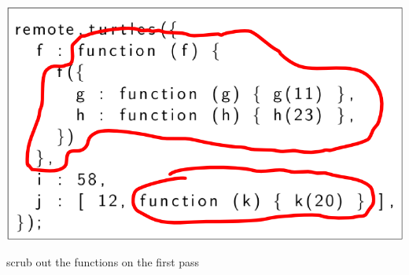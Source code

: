 \documentclass{beamer}
\begin{document}
\begin{frame}
\begin{columns}[c]
\begin{center}
        \includegraphics[scale=0.28]{images/scrub_1.png}
        \newline
        
        \huge
        scrub out the functions on the first pass
        
        \end{center}
    \end{columns}
\end{frame}
\end{document}
